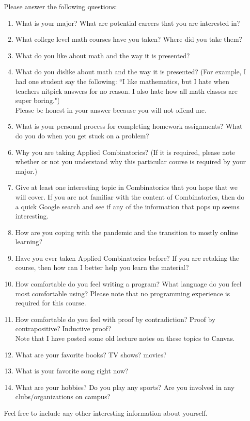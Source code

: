 \documentclass[english]{article}
\begin{document}
\begin{enumerate}
\noindent Please answer the following questions:
\begin{enumerate}
\item What is your major?  What are potential careers that you are interested in?
\item What college level math courses have you taken? Where did you take them?
\item What do you like about math and the way it is presented?
\item What do you dislike about math and the way it is presented? (For example, I had one student say the following: ``I like mathematics, but I hate when teachers nitpick answers for no reason.  I also hate how all math classes are super boring.")\\  Please be honest in your answer because you will not offend me.  
\item What is your personal process for completing homework assignments?  What do you do when you get stuck on a problem?
\item Why you are taking Applied Combinatorics? (If it is required, please note whether or not you understand why this particular course is required by your major.)
\item Give at least one interesting topic in Combinatorics that you hope that we will cover.  If you are not familiar with the content of Combinatorics, then do a quick Google search and see if any of the information that pops up seems interesting.
\item How are you coping with the pandemic and the transition to mostly online learning?
\item Have you ever taken Applied Combinatorics before?  If you are retaking the course, then how can I better help you learn the material?
\item How comfortable do you feel writing a program? What language do you feel most comfortable using? Please note that no programming experience is required for this course.
\item How comfortable do you feel with proof by contradiction?  Proof by contrapositive?  Inductive proof?\\
Note that I have posted some old lecture notes on these topics to Canvas.
\item What are your favorite books? TV shows? movies?
\item What is your favorite song right now?
\item What are your hobbies?  Do you play any sports? Are you involved in any clubs/organizations on campus?  
\end{enumerate}
Feel free to include any other interesting information about yourself.  \\



\end{enumerate}
\end{document}
